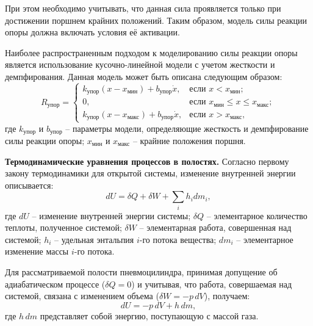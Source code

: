 При этом необходимо учитывать, что данная сила проявляется только при достижении
поршнем крайних положений. Таким образом, модель силы реакции опоры должна включать
условия её активации.

Наиболее распространенным подходом к моделированию силы реакции опоры является использование кусочно-линейной модели с
учетом жесткости и демпфирования. Данная модель может быть описана следующим образом:
\begin{equation}
	\label{eq:ch2/support_reaction}
	R_\text{упор} = \begin{cases}
		k_\text{упор}(x - x_\text{мин}) + b_\text{упор}\dot{x},  & \text{если } x < x_\text{мин};                       \\
		0,                                                       & \text{если } x_\text{мин} \leq x \leq x_\text{макс}; \\
		k_\text{упор}(x - x_\text{макс}) + b_\text{упор}\dot{x}, & \text{если } x > x_\text{макс},
	\end{cases}
\end{equation}
где $k_\text{упор}$ и $b_\text{упор}$ -- параметры модели, определяющие жесткость и демпфирование силы реакции опоры;
$x_\text{мин}$ и $x_\text{макс}$ -- крайние положения поршня.


\textbf{Термодинамические уравнения процессов в полостях.}
Согласно первому закону термодинамики для открытой системы,
изменение внутренней энергии описывается:
\begin{equation}
	\label{eq:ch2/first_law}
	dU = \delta Q + \delta W + \sum_i h_i dm_i,
\end{equation}
где $dU$ -- изменение внутренней энергии системы;
$\delta Q$ -- элементарное количество теплоты, полученное системой;
$\delta W$ -- элементарная работа, совершенная над системой;
$h_i$ -- удельная энтальпия $i$-го потока вещества;
$dm_i$ -- элементарное изменение массы $i$-го потока.

Для рассматриваемой полости пневмоцилиндра, принимая допущение об
адиабатическом процессе ($\delta Q = 0$) и учитывая, что работа,
совершаемая над системой, связана с изменением объема ($\delta W = -p\,dV$), получаем:
\begin{equation}
	\label{eq:ch2/internal_energy_change}
	dU = -p\,dV + h\,dm,
\end{equation}
где $h\,dm$ представляет собой энергию, поступающую с массой газа.

